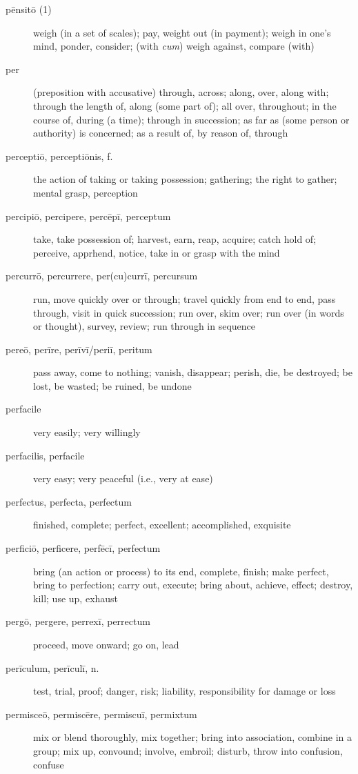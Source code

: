 \begin{description}
    \item[pēnsitō (1)] weigh (in a set of scales); pay, weight out (in payment); weigh in one's mind, ponder, consider; (with \textit{cum}) weigh against, compare (with)
    \item[per] \marginnote{*}(preposition with accusative) through, across; along, over, along with; through the length of, along (some part of); all over, throughout; in the course of, during (a time); through in succession; as far as (some person or authority) is concerned; as a result of, by reason of, through
    \item[perceptiō, perceptiōnis, f.] the action of taking or taking possession; gathering; the right to gather; mental grasp, perception
    \item[percipiō, percipere, percēpī, perceptum] take, take possession of; harvest, earn, reap, acquire; catch hold of; perceive, apprhend, notice, take in or grasp with the mind
    \item[percurrō, percurrere, per(cu)currī, percursum] run, move quickly over or through; travel quickly from end to end, pass through, visit in quick succession; run over, skim over; run over (in words or thought), survey, review; run through in sequence
    \item[pereō, perīre, perīvī/periī, peritum] pass away, come to nothing; vanish, disappear; perish, die, be destroyed; be lost, be wasted; be ruined, be undone
    \item[perfacile] very easily; very willingly
    \item[perfacilis, perfacile] very easy; very peaceful (i.e., very at ease)
    \item[perfectus, perfecta, perfectum] finished, complete; perfect, excellent; accomplished, exquisite
    \item[perficiō, perficere, perfēcī, perfectum] bring (an action or process) to its end, complete, finish; make perfect, bring to perfection; carry out, execute; bring about, achieve, effect; destroy, kill; use up, exhaust
    \item[pergō, pergere, perrexī, perrectum] \marginnote{*}proceed, move onward; go on, lead
    \item[perīculum, perīculī, n.] \marginnote{*}test, trial, proof; danger, risk; liability, responsibility for damage or loss
    \item[permisceō, permiscēre, permiscuī, permixtum] mix or blend thoroughly, mix together; bring into association, combine in a group; mix up, convound; involve, embroil; disturb, throw into confusion, confuse

\end{description}
